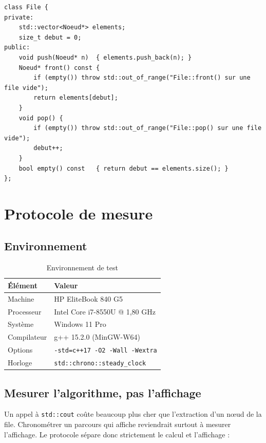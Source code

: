 \documentclass[11pt,a4paper]{article}
\begin{document}
\begin{lstlisting}
class File {
private:
    std::vector<Noeud*> elements;
    size_t debut = 0;
public:
    void push(Noeud* n)  { elements.push_back(n); }
    Noeud* front() const {
        if (empty()) throw std::out_of_range("File::front() sur une file vide");
        return elements[debut];
    }
    void pop() {
        if (empty()) throw std::out_of_range("File::pop() sur une file vide");
        debut++;
    }
    bool empty() const   { return debut == elements.size(); }
};
\end{lstlisting}

\section{Protocole de mesure}

\subsection{Environnement}

\begin{table}[H]
\centering
\begin{tabular}{ll}
\toprule
\textbf{Élément} & \textbf{Valeur} \\
\midrule
Machine       & HP EliteBook 840 G5 \\
Processeur    & Intel Core i7-8550U @ 1,80 GHz \\
Système       & Windows 11 Pro \\
Compilateur   & g++ 15.2.0 (MinGW-W64) \\
Options       & \texttt{-std=c++17 -O2 -Wall -Wextra} \\
Horloge       & \texttt{std::chrono::steady\_clock} \\
\bottomrule
\end{tabular}
\caption{Environnement de test}
\end{table}

\subsection{Mesurer l'algorithme, pas l'affichage}

Un appel à \texttt{std::cout} coûte beaucoup plus cher que l'extraction d'un nœud de la file.
Chronométrer un parcours qui affiche reviendrait surtout à mesurer l'affichage. Le protocole
sépare donc strictement le calcul et l'affichage :
\end{document}
